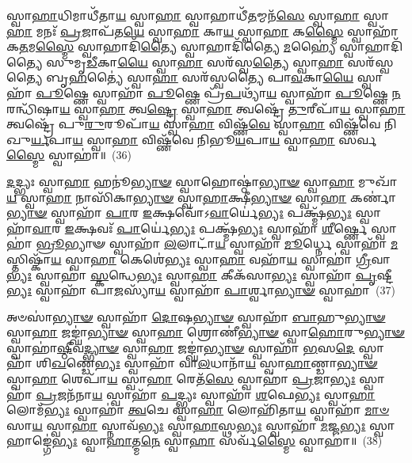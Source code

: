 {\anuvakamend[{\-\ul{𑌬𑍍𑌰𑌾}\-\-\ul{𑌹𑍍𑌮}\-𑌣𑍇𑌨𑍈𑌕᳴𑌞𑍍𑌚}]}%

𑌸𑍍𑌵𑌾\-\ul{𑌹𑌾}\-𑌧𑌿𑌮𑌾𑌧𑍀᳴𑌤𑌾\-\ul{𑌯} 𑌸𑍍𑌵𑌾\-\ul{𑌹𑌾} 𑌸𑍍𑌵𑌾𑌹𑌾𑌧𑍀᳴\-\ul{𑌤}\-𑌮𑍍𑌮𑌨᳴\-\ul{𑌸𑍇} 𑌸𑍍𑌵𑌾\-\ul{𑌹𑌾} 𑌸𑍍𑌵𑌾\-\ul{𑌹𑌾} 𑌮𑌨𑌃᳴ \ul{𑌪𑍍𑌰}\-𑌜𑌾𑌪᳴𑌤\-\ul{𑌯𑍇} 𑌸𑍍𑌵𑌾\-\ul{𑌹𑌾} 𑌕𑌾\-\ul{𑌯} 𑌸𑍍𑌵𑌾\-\ul{𑌹𑌾} 𑌕\-\ul{𑌸𑍍𑌮𑍈} 𑌸𑍍𑌵𑌾𑌹𑌾᳴ 𑌕\-\ul{𑌤}\-𑌮\-\ul{𑌸𑍍𑌮𑍈} 𑌸𑍍𑌵𑌾𑌹𑌾𑌦𑌿᳴\-\ul{𑌤𑍍𑌯𑍈} 𑌸𑍍𑌵𑌾𑌹𑌾𑌦𑌿᳴𑌤𑍍𑌯𑍈 \ul{𑌮}\-𑌹𑍍𑌯𑍈॑ 𑌸𑍍𑌵𑌾𑌹𑌾𑌦𑌿᳴𑌤𑍍𑌯𑍈 𑌸𑍁𑌮𑍃\-\ul{𑌡𑍀}\-𑌕𑌾\-\ul{𑌯𑍈} 𑌸𑍍𑌵𑌾\-\ul{𑌹𑌾} 𑌸𑌰᳴𑌸𑍍𑌵\-\ul{𑌤𑍍𑌯𑍈} 𑌸𑍍𑌵𑌾\-\ul{𑌹𑌾} 𑌸𑌰᳴𑌸𑍍𑌵𑌤𑍍𑌯𑍈 𑌬𑍃\-\ul{𑌹}\-𑌤𑍍𑌯𑍈॑ 𑌸𑍍𑌵𑌾\-\ul{𑌹𑌾} 𑌸𑌰᳴𑌸𑍍𑌵𑌤𑍍𑌯𑍈 𑌪𑌾\-\ul{𑌵}\-𑌕𑌾\-\ul{𑌯𑍈} 𑌸𑍍𑌵𑌾𑌹𑌾᳴ \ul{𑌪𑍂}\-𑌷𑍍𑌣𑍇 𑌸𑍍𑌵𑌾𑌹𑌾᳴ \ul{𑌪𑍂}\-𑌷𑍍𑌣𑍇 𑌪𑍍𑌰᳴\-\ul{𑌪}\-𑌥𑍍𑌯𑌾᳴\-\ul{𑌯} 𑌸𑍍𑌵𑌾𑌹𑌾᳴ \ul{𑌪𑍂}\-𑌷𑍍𑌣𑍇 \ul{𑌨}\-𑌰𑌨𑍍𑌧𑌿᳴𑌷𑌾\-\ul{𑌯} 𑌸𑍍𑌵𑌾\-\ul{𑌹𑌾} 𑌤𑍍𑌵\-\ul{𑌷𑍍𑌟𑍍𑌰𑍇} 𑌸𑍍𑌵𑌾\-\ul{𑌹𑌾} 𑌤𑍍𑌵𑌷𑍍𑌟𑍍𑌰𑍇᳴ \ul{𑌤𑍁}\-𑌰𑍀𑌪𑌾᳴\-\ul{𑌯} 𑌸𑍍𑌵𑌾\-\ul{𑌹𑌾} 𑌤𑍍𑌵𑌷𑍍𑌟𑍍𑌰𑍇᳴ 𑌪𑍁\-\ul{𑌰𑍁}\-𑌰𑍂𑌪𑌾᳴\-\ul{𑌯} 𑌸𑍍𑌵𑌾\-\ul{𑌹𑌾} 𑌵𑌿𑌷𑍍𑌣᳴\-\ul{𑌵𑍇} 𑌸𑍍𑌵𑌾\-\ul{𑌹𑌾} 𑌵𑌿𑌷𑍍𑌣᳴𑌵𑍇 𑌨𑌿𑌖𑍁\-\ul{𑌰𑍍𑌯}\-𑌪𑌾\-\ul{𑌯} 𑌸𑍍𑌵𑌾\-\ul{𑌹𑌾} 𑌵𑌿𑌷𑍍𑌣᳴𑌵𑍇 𑌨𑌿𑌭𑍂\-\ul{𑌯}\-𑌪𑌾\-\ul{𑌯} 𑌸𑍍𑌵𑌾\-\ul{𑌹𑌾} 𑌸𑌰𑍍𑌵\-\ul{𑌸𑍍𑌮𑍈} 𑌸𑍍𑌵𑌾𑌹𑌾॑॥~(36)

{\anuvakamend[{\-\ul{𑌪𑍁}\-\-\ul{𑌰𑍁}\-𑌰𑍂𑌪𑌾᳴\-\ul{𑌯} 𑌸𑍍𑌵𑌾\-\ul{𑌹𑌾} 𑌦𑌶᳴ 𑌚}]}%

\-\ul{𑌦}\-𑌦𑍍𑌭𑍍𑌯𑌃 𑌸𑍍𑌵𑌾\-\ul{𑌹𑌾} 𑌹𑌨𑍂॑\-\ul{𑌭𑍍𑌯𑌾}\-\-\ul{𑍟} 𑌸𑍍𑌵𑌾𑌹𑍋𑌷𑍍𑌠𑌾॑\-\ul{𑌭𑍍𑌯𑌾}\-\-\ul{𑍟} 𑌸𑍍𑌵𑌾\-\ul{𑌹𑌾} 𑌮𑍁𑌖𑌾᳴\-\ul{𑌯} 𑌸𑍍𑌵𑌾\-\ul{𑌹𑌾} 𑌨𑌾𑌸𑌿᳴𑌕𑌾\-\ul{𑌭𑍍𑌯𑌾}\-\-\ul{𑍟} 𑌸𑍍𑌵𑌾\-\ul{𑌹𑌾}\-𑌕𑍍𑌷𑍀\-\ul{𑌭𑍍𑌯𑌾}\-\-\ul{𑍟} 𑌸𑍍𑌵𑌾\-\ul{𑌹𑌾} 𑌕𑌰𑍍𑌣𑌾॑\-\ul{𑌭𑍍𑌯𑌾}\-\-\ul{𑍟} 𑌸𑍍𑌵𑌾𑌹𑌾᳴ \ul{𑌪𑌾}\-𑌰 \ul{𑌇}\-𑌕𑍍𑌷𑌵𑍋᳴\-𑌽\-\ul{𑌵𑌾}\-𑌰𑍍𑌯𑍇॑\-\ul{𑌭𑍍𑌯𑌃} 𑌪𑌕𑍍𑌷𑍍𑌮᳴\-\ul{𑌭𑍍𑌯𑌃} 𑌸𑍍𑌵𑌾𑌹𑌾᳴\-\ul{𑌵𑌾}\-𑌰 \ul{𑌇}\-𑌕𑍍𑌷𑌵𑌃᳴ \ul{𑌪𑌾}\-𑌰𑍍𑌯𑍇॑\-\ul{𑌭𑍍𑌯𑌃} 𑌪𑌕𑍍𑌷𑍍𑌮᳴\-\ul{𑌭𑍍𑌯𑌃} 𑌸𑍍𑌵𑌾𑌹𑌾᳴ \ul{𑌶𑍀}\-𑌰𑍍\mbox{}𑌷𑍍𑌣𑍇 𑌸𑍍𑌵𑌾𑌹𑌾॑ \ul{𑌭𑍍𑌰𑍂}\-𑌭𑍍𑌯𑌾𑍟 𑌸𑍍𑌵𑌾𑌹𑌾᳴ \ul{𑌲}\-𑌲𑌾𑌟𑌾᳴\-\ul{𑌯} 𑌸𑍍𑌵𑌾𑌹𑌾᳴ \ul{𑌮𑍂}\-𑌰𑍍𑌧𑍍𑌨𑍇 𑌸𑍍𑌵𑌾𑌹𑌾᳴ \ul{𑌮}\-𑌸𑍍𑌤𑌿𑌷𑍍𑌕𑌾᳴\-\ul{𑌯} 𑌸𑍍𑌵𑌾\-\ul{𑌹𑌾} 𑌕𑍇𑌶𑍇॑\-\ul{𑌭𑍍𑌯𑌃} 𑌸𑍍𑌵𑌾\-\ul{𑌹𑌾} 𑌵𑌹𑌾᳴\-\ul{𑌯} 𑌸𑍍𑌵𑌾𑌹𑌾॑ \ul{𑌗𑍍𑌰𑍀}\-𑌵𑌾\-\ul{𑌭𑍍𑌯𑌃} 𑌸𑍍𑌵𑌾𑌹𑌾॑ \ul{𑌸𑍍𑌕}\-𑌨𑍍𑌧𑍇\-\ul{𑌭𑍍𑌯𑌃} 𑌸𑍍𑌵𑌾\-\ul{𑌹𑌾} 𑌕𑍀𑌕᳴𑌸𑌾\-\ul{𑌭𑍍𑌯𑌃} 𑌸𑍍𑌵𑌾𑌹𑌾᳴ \ul{𑌪𑍃}\-𑌷𑍍𑌟𑍀\-\ul{𑌭𑍍𑌯𑌃} 𑌸𑍍𑌵𑌾𑌹𑌾᳴ 𑌪𑌾\-\ul{𑌜}\-𑌸𑍍𑌯𑌾᳴\-\ul{𑌯} 𑌸𑍍𑌵𑌾𑌹𑌾᳴ \ul{𑌪𑌾}\-𑌰𑍍𑌶𑍍𑌵𑌾\-\ul{𑌭𑍍𑌯𑌾}\-\-\ul{𑍟} 𑌸𑍍𑌵𑌾𑌹𑌾॑~(37)

𑌅𑍞𑌸𑌾॑\-\ul{𑌭𑍍𑌯𑌾}\-\-\ul{𑍟} 𑌸𑍍𑌵𑌾𑌹𑌾᳴ \ul{𑌦𑍋}\-𑌷\-\ul{𑌭𑍍𑌯𑌾}\-\-\ul{𑍟} 𑌸𑍍𑌵𑌾𑌹𑌾᳴ \ul{𑌬𑌾}\-𑌹𑍁\-\ul{𑌭𑍍𑌯𑌾}\-\-\ul{𑍟} 𑌸𑍍𑌵𑌾\-\ul{𑌹𑌾} 𑌜𑌙𑍍𑌘𑌾॑\-\ul{𑌭𑍍𑌯𑌾}\-\-\ul{𑍟} 𑌸𑍍𑌵𑌾\-\ul{𑌹𑌾} 𑌶𑍍𑌰𑍋𑌣𑍀॑\-\ul{𑌭𑍍𑌯𑌾}\-\-\ul{𑍟} 𑌸𑍍𑌵𑌾\-\ul{𑌹𑍋}\-𑌰𑍁\-\ul{𑌭𑍍𑌯𑌾}\-\-\ul{𑍟} 𑌸𑍍𑌵𑌾𑌹𑌾॑\-\ul{𑌷𑍍𑌠𑍀}\-𑌵\-\ul{𑌦𑍍𑌭𑍍𑌯𑌾}\-\-\ul{𑍟} 𑌸𑍍𑌵𑌾\-\ul{𑌹𑌾} 𑌜𑌙𑍍𑌘𑌾॑\-\ul{𑌭𑍍𑌯𑌾}\-\-\ul{𑍟} 𑌸𑍍𑌵𑌾𑌹𑌾᳴ \ul{𑌭}\-𑌸\-\ul{𑌦𑍇} 𑌸𑍍𑌵𑌾𑌹𑌾᳴ 𑌶𑌿\-\ul{𑌖}\-𑌣𑍍𑌡𑍇\-\ul{𑌭𑍍𑌯𑌃} 𑌸𑍍𑌵𑌾𑌹𑌾᳴ 𑌵𑌾\-\ul{𑌲}\-𑌧𑌾𑌨𑌾᳴\-\ul{𑌯} 𑌸𑍍𑌵𑌾\-\ul{𑌹𑌾}\-𑌣𑍍𑌡𑌾\-\ul{𑌭𑍍𑌯𑌾}\-\-\ul{𑍟} 𑌸𑍍𑌵𑌾\-\ul{𑌹𑌾} 𑌶𑍇𑌪𑌾᳴\-\ul{𑌯} 𑌸𑍍𑌵𑌾\-\ul{𑌹𑌾} 𑌰𑍇𑌤᳴\-\ul{𑌸𑍇} 𑌸𑍍𑌵𑌾𑌹𑌾॑ \ul{𑌪𑍍𑌰}\-𑌜𑌾\-\ul{𑌭𑍍𑌯𑌃} 𑌸𑍍𑌵𑌾𑌹𑌾॑ \ul{𑌪𑍍𑌰}\-𑌜𑌨᳴𑌨𑌾\-\ul{𑌯} 𑌸𑍍𑌵𑌾𑌹𑌾᳴ \ul{𑌪}\-𑌦𑍍𑌭𑍍𑌯𑌃 𑌸𑍍𑌵𑌾𑌹𑌾᳴ \ul{𑌶}\-𑌫𑍇\-\ul{𑌭𑍍𑌯𑌃} 𑌸𑍍𑌵𑌾\-\ul{𑌹𑌾} 𑌲𑍋𑌮᳴\-\ul{𑌭𑍍𑌯𑌃} 𑌸𑍍𑌵𑌾𑌹𑌾॑ \ul{𑌤𑍍𑌵}\-𑌚𑍇 𑌸𑍍𑌵𑌾\-\ul{𑌹𑌾} 𑌲𑍋𑌹𑌿᳴𑌤𑌾\-\ul{𑌯} 𑌸𑍍𑌵𑌾𑌹𑌾᳴ \ul{𑌮𑌾}\-\-\ul{𑍞}\-𑌸𑌾\-\ul{𑌯} 𑌸𑍍𑌵𑌾\-\ul{𑌹𑌾} 𑌸𑍍𑌨𑌾𑌵᳴\-\ul{𑌭𑍍𑌯𑌃} 𑌸𑍍𑌵𑌾\-\ul{𑌹𑌾}\-𑌸𑍍𑌥\-\ul{𑌭𑍍𑌯𑌃} 𑌸𑍍𑌵𑌾𑌹𑌾᳴ \ul{𑌮}\-𑌜𑍍𑌜\-\ul{𑌭𑍍𑌯𑌃} 𑌸𑍍𑌵𑌾𑌹𑌾𑌙𑍍𑌗𑍇॑\-\ul{𑌭𑍍𑌯𑌃} 𑌸𑍍𑌵𑌾\-\ul{𑌹𑌾}\-𑌤𑍍𑌮\-\ul{𑌨𑍇} 𑌸𑍍𑌵𑌾\-\ul{𑌹𑌾} 𑌸𑌰𑍍𑌵᳴\-\ul{𑌸𑍍𑌮𑍈} 𑌸𑍍𑌵𑌾𑌹𑌾॑॥~(38)

